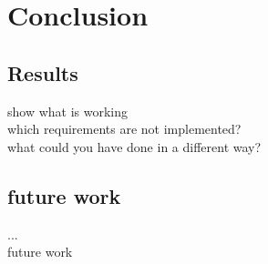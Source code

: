 \section{Conclusion}

\subsection{Results}
\label{6sec:5}
   show what is working
\\ which requirements are not implemented?
\\ what could you have done in a different way?

\subsection{future work}
\label{sec:future Work}
...
\\ future work